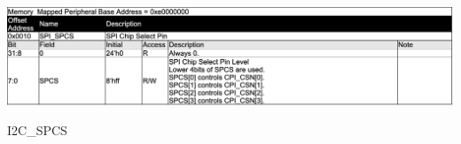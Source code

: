 \begin{table}[H]
    \includegraphics[width=1.0\columnwidth]{./Table/REG_SPI_SPCS.png}
    \caption{I2C\_SPCS}
    \label{tb:REG_I2C_SPCS}
\end{table}
